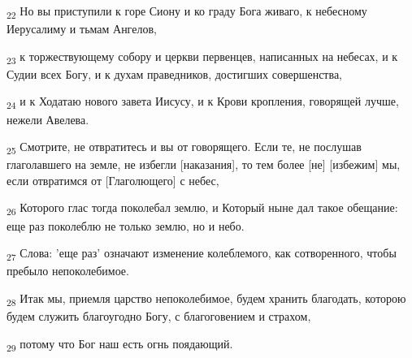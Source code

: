\begin{tcolorbox}
\textsubscript{22} Но вы приступили к горе Сиону и ко граду Бога живаго, к небесному Иерусалиму и тьмам Ангелов,
\end{tcolorbox}
\begin{tcolorbox}
\textsubscript{23} к торжествующему собору и церкви первенцев, написанных на небесах, и к Судии всех Богу, и к духам праведников, достигших совершенства,
\end{tcolorbox}
\begin{tcolorbox}
\textsubscript{24} и к Ходатаю нового завета Иисусу, и к Крови кропления, говорящей лучше, нежели Авелева.
\end{tcolorbox}
\begin{tcolorbox}
\textsubscript{25} Смотрите, не отвратитесь и вы от говорящего. Если те, не послушав глаголавшего на земле, не избегли [наказания], то тем более [не] [избежим] мы, если отвратимся от [Глаголющего] с небес,
\end{tcolorbox}
\begin{tcolorbox}
\textsubscript{26} Которого глас тогда поколебал землю, и Который ныне дал такое обещание: еще раз поколеблю не только землю, но и небо.
\end{tcolorbox}
\begin{tcolorbox}
\textsubscript{27} Слова: 'еще раз' означают изменение колеблемого, как сотворенного, чтобы пребыло непоколебимое.
\end{tcolorbox}
\begin{tcolorbox}
\textsubscript{28} Итак мы, приемля царство непоколебимое, будем хранить благодать, которою будем служить благоугодно Богу, с благоговением и страхом,
\end{tcolorbox}
\begin{tcolorbox}
\textsubscript{29} потому что Бог наш есть огнь поядающий.
\end{tcolorbox}
